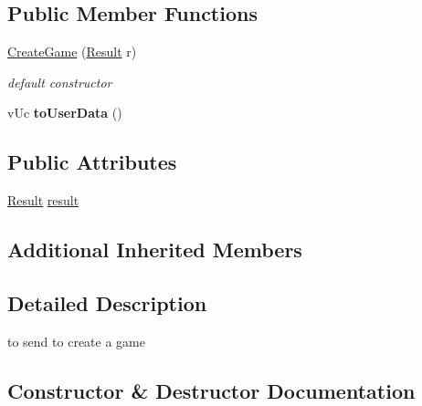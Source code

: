 \subsection*{Public Member Functions}
\begin{DoxyCompactItemize}
\item 
\hyperlink{class_network_1_1_messages_1_1_create_game_a1d320d73f67b503eb2026be63cee6aed}{Create\+Game} (\hyperlink{class_network_1_1_messages_1_1_base_a646d774928c7dfac987228f26ab5d46a}{Result} r)
\begin{DoxyCompactList}\small\item\em default constructor \end{DoxyCompactList}\item 
\mbox{\label{class_network_1_1_messages_1_1_create_game_a905330eb351f7d5fa33cd488ce039dba}} 
v\+Uc {\bfseries to\+User\+Data} ()
\end{DoxyCompactItemize}
\subsection*{Public Attributes}
\begin{DoxyCompactItemize}
\item 
\hyperlink{class_network_1_1_messages_1_1_base_a646d774928c7dfac987228f26ab5d46a}{Result} \hyperlink{class_network_1_1_messages_1_1_create_game_a8ad62ff6d3c12edc7c360ab041d2bf4f}{result}
\end{DoxyCompactItemize}
\subsection*{Additional Inherited Members}


\subsection{Detailed Description}
to send to create a game 

\subsection{Constructor \& Destructor Documentation}
\mbox{\label{class_network_1_1_messages_1_1_create_game_a1d320d73f67b503eb2026be63cee6aed}} 
